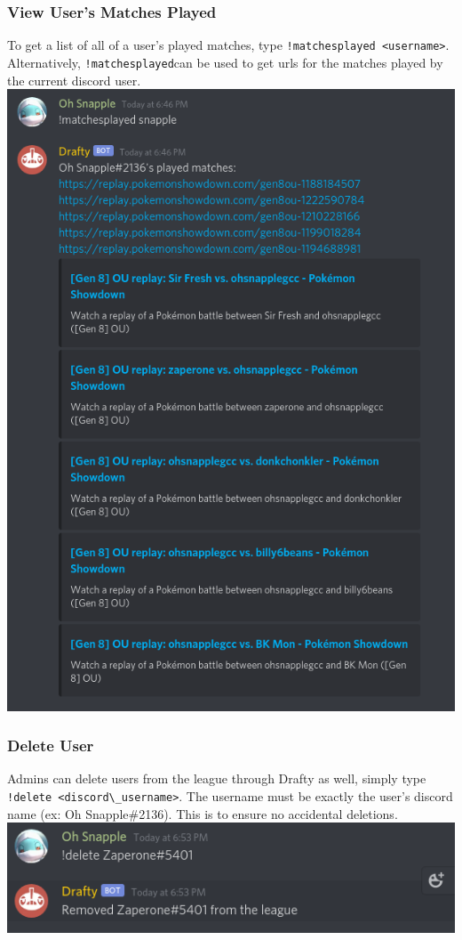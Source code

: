 \documentclass{article}
\begin{document}
\subsubsection*{View User's Matches Played}
To get a list of all of a user's played matches, type \verb|!matchesplayed <username>|.
Alternatively, \verb|!matchesplayed|can be used to get urls for the matches played by the current discord user.\\ 
\includegraphics[scale=.5]{matches_played.png}
\newpage
\subsubsection*{Delete User}
Admins can delete users from the league through Drafty as well, simply type \verb|!delete <discord\_username>|.
The username must be exactly the user's discord name (ex: Oh Snapple\#2136). This is to ensure no accidental deletions.\\
\includegraphics[scale=.5]{delete.png}
\end{document}

